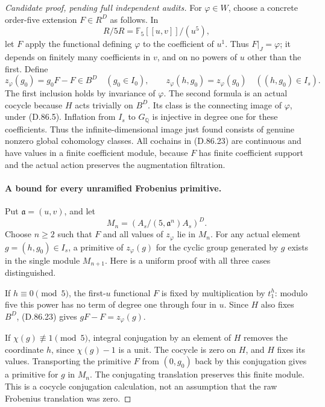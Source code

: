\begin{proof}[Candidate proof, pending full independent audits]
For \(\varphi\in W\), choose a concrete order-five extension
\(F\in R^D\) as follows. In
\[
                  R/5R=\mathbb F_5[[u,v]]/(u^5),
\]
let \(F\) apply the functional defining \(\varphi\) to the
coefficient of \(u^1\). Thus \(F|_J=\varphi\); it depends
on finitely many coefficients in \(v\), and on no powers
of \(u\) other than the first. Define
\[
 z_\varphi(g_0)=g_0F-F\in B^D\quad(g_0\in I_0),
 \qquad z_\varphi(h,g_0)=z_\varphi(g_0)\quad((h,g_0)\in I_s).
                                                               \tag{D.86.23}
\]
The first inclusion holds by invariance of \(\varphi\).
The second formula is an actual cocycle because \(H\)
acts trivially on \(B^D\). Its class is the connecting
image of \(\varphi\), under (D.86.5). Inflation from
\(I_s\) to \(G_{\mathbb Q}\) is injective in degree one
for these coefficients. Thus the infinite-dimensional image
just found consists of genuine nonzero global cohomology
classes. All cochains in (D.86.23) are continuous and have
values in a finite coefficient module, because \(F\) has
finite coefficient support and the actual action preserves
the augmentation filtration.

\paragraph{A bound for every unramified Frobenius primitive.}
Put \(\mathfrak a=(u,v)\), and let
\[
              M_n=(A_s/(5,\mathfrak a^n)A_s)^D.
\]
Choose \(n\ge2\) such that \(F\) and all values of
\(z_\varphi\) lie in \(M_n\). For any actual element
\(g=(h,g_0)\in I_s\), a primitive of
\(z_\varphi(g)\) for the cyclic group generated by \(g\)
exists in the single module \(M_{n+1}\). Here is a uniform
proof with all three cases distinguished.

If \(h\equiv0\pmod5\), the first-\(u\) functional \(F\)
is fixed by multiplication by \(t_1^h\): modulo five this
power has no term of degree one through four in \(u\).
Since \(H\) also fixes \(B^D\), (D.86.23) gives
\(gF-F=z_\varphi(g)\).

If \(\chi(g)\not\equiv1\pmod5\), integral conjugation
by an element of \(H\) removes the coordinate \(h\),
since \(\chi(g)-1\) is a unit. The cocycle is zero on
\(H\), and \(H\) fixes its values. Transporting the
primitive \(F\) from \((0,g_0)\) back by this conjugation
gives a primitive for \(g\) in \(M_n\). The conjugating
translation preserves this finite module. This is a
cocycle conjugation calculation, not an assumption that
the raw Frobenius translation was zero.


\end{proof}
